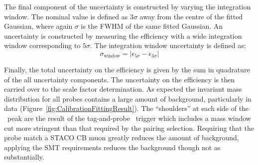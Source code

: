 The final component of the uncertainty is constructed by varying the integration window. The nominal value is defined as $3\sigma$ away from the centre of the fitted Gaussian, where again $\sigma$ is the FWHM of the same fitted Gaussian. An uncertainty is constructed by measuring the efficiency with a wide integration window corresponding to $5\sigma$. The integration window uncertainty is defined as:
%
\begin{equation}
  \sigma_{\textrm{window}} = |\epsilon_{5\sigma}-\epsilon_{3\sigma}|
\end{equation}

Finally, the total uncertainty on the efficiency is given by the sum in quadrature of the all uncertainty components. The uncertainty on the efficiency is then carried over to the scale factor determination.
As expected the invariant mass distribution for all probes contains a large amount of background, particularly in data (Figure~\ref{fig:CalibrationFittingResult}). The ``shoulders'' at each side of the \jpsi\ peak are the result of the tag-and-probe \jpsi\ trigger which includes a mass window cut more stringent than that required by the pairing selection. Requiring that the probe match a STACO CB muon greatly reduces the amount of background, applying the SMT requirements reduces the background though not as substantially.

